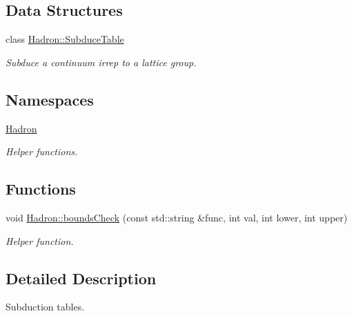 \subsection*{Data Structures}
\begin{DoxyCompactItemize}
\item 
class \mbox{\hyperlink{classHadron_1_1SubduceTable}{Hadron\+::\+Subduce\+Table}}
\begin{DoxyCompactList}\small\item\em Subduce a continuum irrep to a lattice group. \end{DoxyCompactList}\end{DoxyCompactItemize}
\subsection*{Namespaces}
\begin{DoxyCompactItemize}
\item 
 \mbox{\hyperlink{namespaceHadron}{Hadron}}
\begin{DoxyCompactList}\small\item\em Helper functions. \end{DoxyCompactList}\end{DoxyCompactItemize}
\subsection*{Functions}
\begin{DoxyCompactItemize}
\item 
void \mbox{\hyperlink{namespaceHadron_ae5bce98b9d65d71e6c4d4b63034ed0a1}{Hadron\+::bounds\+Check}} (const std\+::string \&func, int val, int lower, int upper)
\begin{DoxyCompactList}\small\item\em Helper function. \end{DoxyCompactList}\end{DoxyCompactItemize}


\subsection{Detailed Description}
Subduction tables. 

